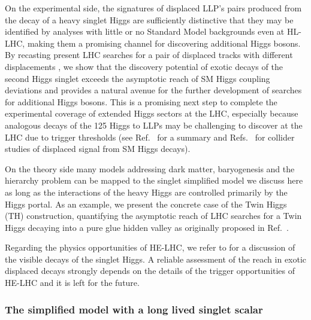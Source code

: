On the experimental side, the signatures of displaced LLP's pairs produced from the decay of a heavy singlet Higgs are sufficiently distinctive that they may be identified by analyses with little or no Standard Model backgrounds even at HL-LHC, making them a promising channel for discovering additional Higgs bosons. By recasting present LHC searches for a pair of displaced tracks with different displacements \cite{Aad:2015uaa,CMS:2014wda,Aaboud:2018aqj,Sirunyan:2018pwn}, we show that the discovery potential of exotic decays of the second Higgs singlet exceeds the asymptotic reach of SM Higgs coupling deviations and provides a natural avenue for the further development of searches for additional Higgs bosons. This is a promising next step to complete the experimental coverage of extended Higgs sectors at the LHC, especially because analogous decays of the 125 \UGeV Higgs to LLPs may be challenging to discover at the LHC due to trigger thresholds (see Ref.~\cite{Curtin:2013fra} for a summary and Refs.~\cite{Clarke:2015ala,Csaki:2015fba,Curtin:2015fna,Pierce:2017taw} for collider studies of displaced signal from SM Higgs decays).
  
On the theory side many models addressing dark matter, baryogenesis and the hierarchy problem can be mapped to the singlet simplified model we discuss here as long as the interactions of the heavy Higgs are controlled primarily by the Higgs portal. As an example, we present the concrete case of the Twin Higgs (TH) construction, quantifying the asymptotic reach of LHC searches for a Twin Higgs decaying into a pure glue hidden valley as originally proposed in Ref.~\cite{Craig:2015pha}. 

Regarding the physics opportunities of HE-LHC, we refer to \cite{CidVidal:2018eel} for a discussion of the visible decays of the singlet Higgs. A reliable assessment of the reach in exotic displaced decays strongly depends on the details of the trigger opportunities of HE-LHC and it is left for the future.    

\subsubsection{The simplified model with a long lived singlet scalar}

